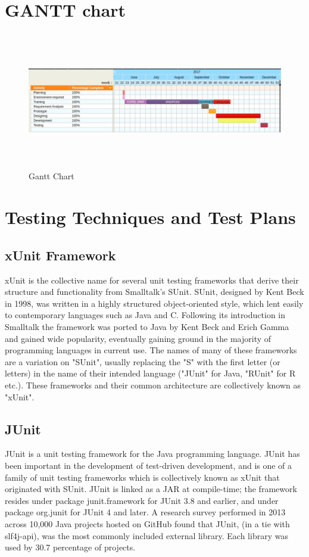 	\section{GANTT chart}
	
	\begin{figure}[ht]
		\centering
		\includegraphics[height=6cm, width=14cm]{images/gantchart.jpg}
		\caption{Gantt Chart}
	\end{figure}
	
	\section{Testing Techniques and Test Plans}
\subsection{xUnit Framework}
xUnit is the collective name for several unit testing frameworks that derive their structure and functionality from Smalltalk's SUnit. SUnit, designed by Kent Beck in 1998, was written in a highly structured object-oriented style, which lent easily to contemporary languages such as Java and C. Following its introduction in Smalltalk the framework was ported to Java by Kent Beck and Erich Gamma and gained wide popularity, eventually gaining ground in the majority of programming languages in current use. The names of many of these frameworks are a variation on "SUnit", usually replacing the "S" with the first letter (or letters) in the name of their intended language ("JUnit" for Java, "RUnit" for R etc.). These frameworks and their common architecture are collectively known as "xUnit".
\subsection{JUnit}
JUnit is a unit testing framework for the Java programming language. JUnit has been important in the development of test-driven development, and is one of a family of unit testing frameworks which is collectively known as xUnit that originated with SUnit. JUnit is linked as a JAR at compile-time; the framework resides under package junit.framework for JUnit 3.8 and earlier, and under package org.junit for JUnit 4 and later. A research survey performed in 2013 across 10,000 Java projects hosted on GitHub found that JUnit, (in a tie with slf4j-api), was the most commonly included external library. Each library was used by 30.7 percentage of projects.

